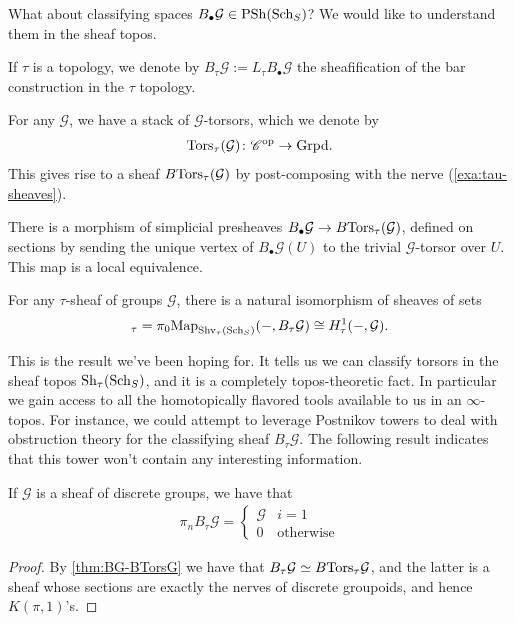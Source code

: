 \documentclass[11pt,openany]{book}
\renewcommand{\Pre}{\mathrm{PSh}}
\begin{document}
What about classifying spaces $B_{\bullet}\mathcal{G}\in \Pre(\Sch_S)$? We would like to understand them in the sheaf topos.

\begin{notation} If $\tau$ is a topology, we denote by $B_\tau \mathcal{G} := L_\tau B_\bullet \mathcal{G}$ the sheafification of the bar construction in the $\tau$ topology.
\end{notation}

\begin{example}
For any $\mathcal{G}$, we have a stack of $\mathcal{G}$-torsors, which we denote by
\begin{align*}
    \mathrm{Tors}_\tau(\mathcal{G}) \colon \mathscr{C}^{\mathrm{op}} \to \mathrm{Grpd}.
\end{align*}
This gives rise to a sheaf $B\mathrm{Tors}_\tau(\mathcal{G})$ by post-composing with the nerve (\autoref{exa:tau-sheaves}).
\end{example}




\begin{theorem}\label{thm:BG-BTorsG} 
\cite[2.3.2]{AHW2}
There is a morphism of simplicial presheaves $B_\bullet \mathcal{G} \to B\mathrm{Tors}_\tau(\mathcal{G})$, defined on sections by sending the unique vertex of $B_\bullet \mathcal{G}(U)$ to the trivial $\mathcal{G}$-torsor over $U$. This map is a local equivalence.
\end{theorem}

\begin{corollary} For any $\tau$-sheaf of groups $\mathcal{G}$, there is a natural isomorphism of sheaves of sets
\begin{align*}
    [-, B_\tau \mathcal{G}]_\tau = \pi_0 \Map_{\Shv_\tau(\Sch_S)}(-,B_\tau \mathcal{G}) \cong H^1_\tau(-,\mathcal{G}).
\end{align*}
\end{corollary}

This is the result we've been hoping for. It tells us we can classify torsors in the sheaf topos $\mathrm{Sh}_\tau(\mathrm{Sch}_S)$, and it is a completely topos-theoretic fact. In particular we gain access to all the homotopically flavored tools available to us in an $\infty$-topos. For instance, we could attempt to leverage Postnikov towers to deal with obstruction theory for the classifying sheaf $B_\tau \mathcal{G}$. The following result indicates that this tower won't contain any interesting information.

\begin{example} If $\mathcal{G}$ is a sheaf of discrete groups, we have that
\begin{align*}
    \pi_n B_\tau \mathcal{G} = \begin{cases}
    \mathcal{G} & i=1 \\
    0 & \text{otherwise}
    \end{cases}
\end{align*}
\end{example}
\begin{proof} By \autoref{thm:BG-BTorsG} we have that $B_\tau \mathcal{G} \simeq B\mathrm{Tors}_\tau \mathcal{G}$, and the latter is a sheaf whose sections are exactly the nerves of discrete groupoids, and hence $K(\pi,1)$'s.
\end{proof}
\end{document}
